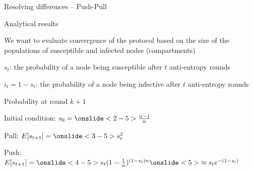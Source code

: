 \begin{frame}{Resolving differences -- Push-Pull}

\begin{Procedure}
\caption{Anti-entropy, Push-Pull protocol executed by process $p_i$:}
\BlankLine
{}
\BlankLine
{}
\end{Procedure}

\end{frame}

\begin{frame}{Analytical results}

\begin{definition}
We want to evaluate convergence of the protocol based on the size of the 
populations of susceptible and infected nodes (\alert{compartments})
\BI
\item $s_t$: the probability of a node being susceptible after $t$
 anti-entropy rounds
\item $i_t = 1 - s_t$: the probability of a node being infective after
$t$ anti-entropy rounds
\EI
\end{definition}

\begin{block}{Probability at round $k+1$}
\BIL
\item Initial condition: $s_0 = \onslide<2-5>{\frac{n-1}{n}}$
\item Pull: $E[s_{t+1}] = \onslide<3-5>{s_{t}^2}$
\item Push: $E[s_{t+1}] = \onslide<4-5>{s_{t}(1-\frac{1}{n})^{(1-s_{t})n}} \onslide<5>{\approx s_{t} e^{-(1-s_{t})}}$
\EIL
\end{block}


\end{frame}

